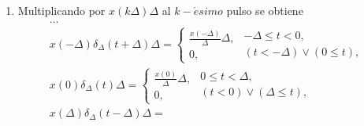 \begin{enumerate}
\item Multiplicando por $x\left( k\Delta \right) \Delta $ al $k-\acute{e}simo$ pulso se obtiene 
\begin{equation}
        \begin{array}{c}
                        ...                                                                    \\ 
                        x\left( -\Delta \right) \delta _{\Delta }\left( t+\Delta \right) \Delta =
                                \left\{ \begin{array}{l}
                                                \frac{x\left( -\Delta \right) }{\Delta }\Delta ,        \\ 
                                                0,
                                        \end{array}
                                        \begin{array}{l}
                                           -\Delta \leq t<0,                                       \\ 
                                          \left( t<-\Delta \right) \vee \left( 0\leq t\right) ,
                                        \end{array}
                                \right.                                                                 \\ 
                        x\left( 0\right) \delta _{\Delta }\left( t\right) \Delta =
                                \left\{ \begin{array}{l}
                                                \frac{x\left( 0\right) }{\Delta }\Delta ,               \\ 
                                                0,
                                        \end{array}
                                        \begin{array}{l}
                                                0\leq t<\Delta ,                                        \\ 
                                                \left( t<0\right) \vee \left( \Delta \leq t\right) ,
                                        \end{array}
                                \right.                                                                 \\ 
                        x\left( \Delta \right) \delta _{\Delta }\left( t-\Delta \right) \Delta =

\end{array}
\end{equation}
\end{enumerate}
